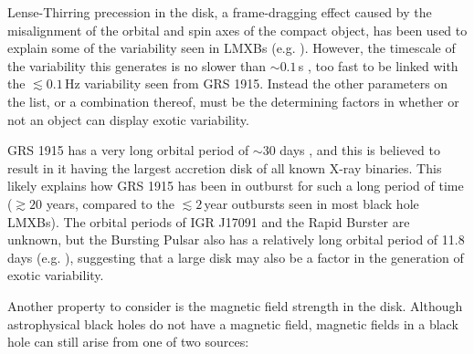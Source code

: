 \par Lense-Thirring precession in the disk, a frame-dragging effect caused by the misalignment of the orbital and spin axes of the compact object, has been used to explain some of the variability seen in LMXBs (e.g. \citealp{Stella_LT}).  However, the timescale of the variability this generates is no slower than $\sim0.1$\,s \citep{Ingram_Solid}, too fast to be linked with the $\lesssim0.1$\,Hz variability seen from GRS 1915.  Instead the other parameters on the list, or a combination thereof, must be the determining factors in whether or not an object can display exotic variability.
\par GRS 1915 has a very long orbital period of $\sim30$ days \citep{Neil_GRSPeriod}, and this is believed to result in it having the largest accretion disk of all known X-ray binaries.  This likely explains how GRS 1915 has been in outburst for such a long period of time ($\gtrsim20$ years, compared to the $\lesssim2$\,year outbursts seen in most black hole LMXBs).  The orbital periods of IGR J17091 and the Rapid Burster are unknown, but the Bursting Pulsar also has a relatively long orbital period of 11.8 days (e.g. \citealp{Finger_BP}), suggesting that a large disk may also be a factor in the generation of exotic variability.
\par Another property to consider is the magnetic field strength in the disk.  Although astrophysical black holes do not have a magnetic field, magnetic fields in a black hole can still arise from one of two sources:
